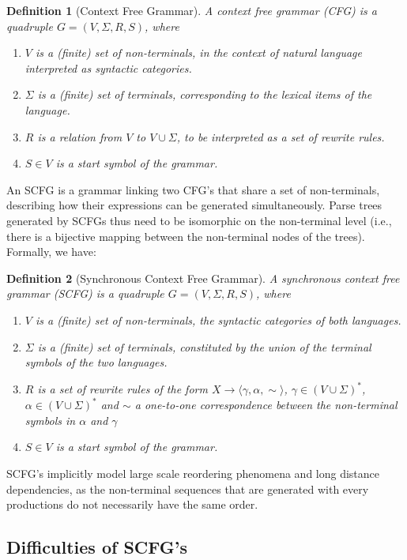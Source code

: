 \documentclass{report}
\theoremstyle{definition}
\theoremstyle{plain}
\newtheorem{definition}{Definition}
\begin{document}
\begin{definition}[Context Free Grammar]
A context free grammar (CFG) is a quadruple $G = (V, \Sigma, R, S)$, where\begin{enumerate}
\item $V$ is a (finite) set of non-terminals, in the context of natural language interpreted as syntactic categories.
\item $\Sigma$ is a (finite) set of terminals, corresponding to the lexical items of the language.
\item $R$ is a relation from $V$ to $V\cup\Sigma$, to be interpreted as a set of rewrite rules.
\item $S\in V$ is a start symbol of the grammar.
\end{enumerate}
\end{definition}

An SCFG \citep{aho1969properties} is a grammar linking two CFG's that share a set of non-terminals, describing how their expressions can be generated simultaneously. Parse trees generated by SCFGs thus need to be isomorphic on the non-terminal level (i.e., there is a bijective mapping between the non-terminal nodes of the trees). Formally, we have:

\begin{definition}[Synchronous Context Free Grammar]
A synchronous context free grammar (SCFG) is a quadruple $G = (V, \Sigma, R, S)$, where\begin{enumerate}
\item $V$ is a (finite) set of non-terminals, the syntactic categories of both languages.
\item $\Sigma$ is a (finite) set of terminals, constituted by the union of the terminal symbols of the two languages.
\item $R$ is a set of rewrite rules of the form $X\rightarrow\langle\gamma,\alpha,\sim\rangle$, $\gamma\in (V\cup\Sigma)^{*}$,  $\alpha\in (V\cup\Sigma)^{*}$ and $\sim$ a one-to-one correspondence between the non-terminal symbols in $\alpha$ and $\gamma$
\item $S\in V$ is a start symbol of the grammar.
\end{enumerate}
\end{definition}

SCFG's implicitly model large scale reordering phenomena and long distance dependencies, as the non-terminal sequences that are generated with every productions do not necessarily have the same order.

\subsection{Difficulties of SCFG's}
\end{document}
